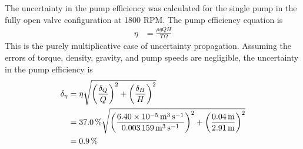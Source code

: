 \noindent The uncertainty in the pump efficiency was calculated for the single pump in the fully open valve configuration at 1800 RPM. The pump efficiency equation is
\begin{align*}
    \eta &= \frac{\rho g Q H}{T \Omega}
\end{align*}
This is the purely multiplicative case of uncertainty propagation. Assuming the errors of torque, density, gravity, and pump speeds are negligible, the uncertainty in the pump efficiency is
\begin{align*}
    \delta_{\eta} &= \eta \sqrt{\left(\frac{\delta_Q}{Q}\right)^2 + \left(\frac{\delta_H}{H}\right)^2} \\
    &= \qty{37.0}{\percent} \sqrt{\left(\frac{\qty{6.40E-05}{\meter\cubed\per\second}}{\qty{0.003159}{\meter\cubed\per\second}}\right)^2 + \left(\frac{\qty{0.04}{\meter}}{\qty{2.91}{\meter}}\right)^2} \\
    &= \qty{0.9}{\percent}
\end{align*}